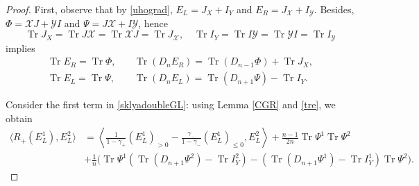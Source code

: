 \documentclass{amsart}
\theoremstyle{definition}
\theoremstyle{remark}
\numberwithin{equation}{section}
\numberwithin{theorem}{section}
\begin{document}
\begin{proof} First, observe that by \eqref{uhograd}, $E_L=J_X + I_Y$
and $E_R= J_{{\mathcal X}}+I_{{\mathcal Y}}$. 
Besides, ${\Phi}={{\mathcal X}} J+{{\mathcal Y}} I$ and ${\Psi}= J{{\mathcal X}}+I{{\mathcal Y}}$, hence
\begin{equation}\label{trcom}
{\operatorname{Tr}} J_X ={\operatorname{Tr}} J{{\mathcal X}}={\operatorname{Tr}}{{\mathcal X}} J={\operatorname{Tr}} J_{{\mathcal X}},\quad  {\operatorname{Tr}} I_Y={\operatorname{Tr}} I{{\mathcal Y}}={\operatorname{Tr}}{{\mathcal Y}} I={\operatorname{Tr}} I_{{\mathcal Y}}
\end{equation}
implies
\begin{equation}\label{tre}
\begin{aligned}
 {\operatorname{Tr}} E_R={\operatorname{Tr}}{\Phi},&\quad {\operatorname{Tr}}(D_nE_R)={\operatorname{Tr}} (D_{n-1}{\Phi})+{\operatorname{Tr}} J_X,\\
 {\operatorname{Tr}} E_L={\operatorname{Tr}}{\Psi},&\quad {\operatorname{Tr}}(D_nE_L)={\operatorname{Tr}} (D_{n+1}{\Psi})-{\operatorname{Tr}} I_Y.
\end{aligned}
 \end{equation}

Consider the first term in \eqref{sklyadoubleGL}: using Lemma \ref{CGR} and \eqref{tre}, we obtain
\begin{equation}\label{1}
\begin{aligned}
\langle R_+(E^1_L), E_L^2\rangle&= \left \langle  \frac{1}{1-\gamma_+} 
(E^1_L)_{>0} - \frac{\gamma_-}{1-\gamma_-}(E^1_L)_{\leq 0}, E_L^2 \right \rangle 
+  \frac {n-1} {2n} {\operatorname{Tr}}{\Psi}^1 {\operatorname{Tr}}{\Psi}^2  \\ 
&
+ \frac{1}{n} \big ({\operatorname{Tr}}{\Psi}^1 ( {\operatorname{Tr}}(D_{n+1} {\Psi}^2)-{\operatorname{Tr}} I_Y^2) - ({\operatorname{Tr}} (D_{n+1} {\Psi}^1)-{\operatorname{Tr}} I_Y^1)
{\operatorname{Tr}} {\Psi}^2 \big ).
\end{aligned}
\end{equation}


\end{proof}
\end{document}
